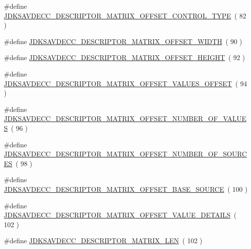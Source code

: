 \begin{DoxyCompactItemize}
\item 
\#define \hyperlink{group__descriptor__matrix_gaddc67ef37d6e684e88272a483f78df84}{J\+D\+K\+S\+A\+V\+D\+E\+C\+C\+\_\+\+D\+E\+S\+C\+R\+I\+P\+T\+O\+R\+\_\+\+M\+A\+T\+R\+I\+X\+\_\+\+O\+F\+F\+S\+E\+T\+\_\+\+C\+O\+N\+T\+R\+O\+L\+\_\+\+T\+Y\+PE}~( 82 )
\item 
\#define \hyperlink{group__descriptor__matrix_ga774df646aeb5e112925fad995dec7cf8}{J\+D\+K\+S\+A\+V\+D\+E\+C\+C\+\_\+\+D\+E\+S\+C\+R\+I\+P\+T\+O\+R\+\_\+\+M\+A\+T\+R\+I\+X\+\_\+\+O\+F\+F\+S\+E\+T\+\_\+\+W\+I\+D\+TH}~( 90 )
\item 
\#define \hyperlink{group__descriptor__matrix_ga07d49694a8b142abb1019ea6db0f88e5}{J\+D\+K\+S\+A\+V\+D\+E\+C\+C\+\_\+\+D\+E\+S\+C\+R\+I\+P\+T\+O\+R\+\_\+\+M\+A\+T\+R\+I\+X\+\_\+\+O\+F\+F\+S\+E\+T\+\_\+\+H\+E\+I\+G\+HT}~( 92 )
\item 
\#define \hyperlink{group__descriptor__matrix_ga846b2308b3aa290d49d13217c3055663}{J\+D\+K\+S\+A\+V\+D\+E\+C\+C\+\_\+\+D\+E\+S\+C\+R\+I\+P\+T\+O\+R\+\_\+\+M\+A\+T\+R\+I\+X\+\_\+\+O\+F\+F\+S\+E\+T\+\_\+\+V\+A\+L\+U\+E\+S\+\_\+\+O\+F\+F\+S\+ET}~( 94 )
\item 
\#define \hyperlink{group__descriptor__matrix_gaa5cde39a2474b066319c9018407e8063}{J\+D\+K\+S\+A\+V\+D\+E\+C\+C\+\_\+\+D\+E\+S\+C\+R\+I\+P\+T\+O\+R\+\_\+\+M\+A\+T\+R\+I\+X\+\_\+\+O\+F\+F\+S\+E\+T\+\_\+\+N\+U\+M\+B\+E\+R\+\_\+\+O\+F\+\_\+\+V\+A\+L\+U\+ES}~( 96 )
\item 
\#define \hyperlink{group__descriptor__matrix_ga066d9adeef32179be2c1774041076db3}{J\+D\+K\+S\+A\+V\+D\+E\+C\+C\+\_\+\+D\+E\+S\+C\+R\+I\+P\+T\+O\+R\+\_\+\+M\+A\+T\+R\+I\+X\+\_\+\+O\+F\+F\+S\+E\+T\+\_\+\+N\+U\+M\+B\+E\+R\+\_\+\+O\+F\+\_\+\+S\+O\+U\+R\+C\+ES}~( 98 )
\item 
\#define \hyperlink{group__descriptor__matrix_ga3c4e7d730101d5195c4eed56af54359e}{J\+D\+K\+S\+A\+V\+D\+E\+C\+C\+\_\+\+D\+E\+S\+C\+R\+I\+P\+T\+O\+R\+\_\+\+M\+A\+T\+R\+I\+X\+\_\+\+O\+F\+F\+S\+E\+T\+\_\+\+B\+A\+S\+E\+\_\+\+S\+O\+U\+R\+CE}~( 100 )
\item 
\#define \hyperlink{group__descriptor__matrix_ga88f55487bfc837a14f7ad5f28572f835}{J\+D\+K\+S\+A\+V\+D\+E\+C\+C\+\_\+\+D\+E\+S\+C\+R\+I\+P\+T\+O\+R\+\_\+\+M\+A\+T\+R\+I\+X\+\_\+\+O\+F\+F\+S\+E\+T\+\_\+\+V\+A\+L\+U\+E\+\_\+\+D\+E\+T\+A\+I\+LS}~( 102 )
\item 
\#define \hyperlink{group__descriptor__matrix_ga28ec282c7b2cb6dc955976b0727a616e}{J\+D\+K\+S\+A\+V\+D\+E\+C\+C\+\_\+\+D\+E\+S\+C\+R\+I\+P\+T\+O\+R\+\_\+\+M\+A\+T\+R\+I\+X\+\_\+\+L\+EN}~( 102 )
\end{DoxyCompactItemize}
